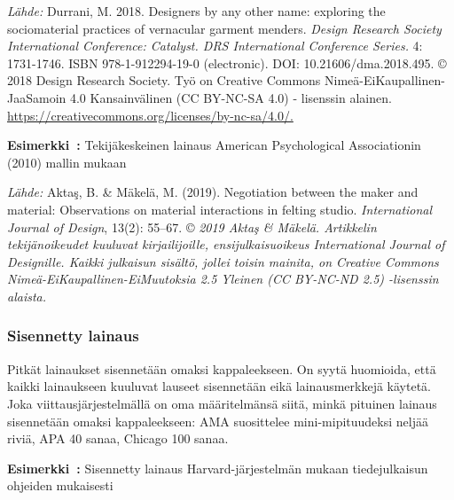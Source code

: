 \documentclass[finnish, 12pt, a4paper, arts, utf8, a-2b, online]{aaltothesis}
\begin{document}
\vspace{1ex}
\noindent
\textit{Lähde:} Durrani, M. 2018. Designers by any other name: exploring the 
sociomaterial practices of vernacular garment menders. \textit{Design Research 
	Society International Conference: Catalyst. DRS International Conference 
	Series.} 4: 1731-1746. ISBN 978-1-912294-19-0 (electronic). 
DOI: 10.21606/dma.2018.495. \copyright{} 2018 Design Research Society. Työ on  
Creative Commons Nimeä-EiKaupallinen-JaaSamoin 4.0 Kansainvälinen (CC BY-NC-SA 
4.0) - lisenssin alainen. 
\url{https://creativecommons.org/licenses/by-nc-sa/4.0/.}

\vspace{1em}
\noindent
{}
\textsf{\textbf{Esimerkki~\theexample:}} Tekijäkeskeinen lainaus American Psychological Associationin (2010) mallin mukaan

\vspace{1ex}
\noindent
{}

\vspace{1ex}
\noindent
\textit{Lähde:} Aktaş, B. \& Mäkelä, M. (2019). Negotiation between the maker 
and material: Observations on material interactions in felting studio. 
\textit{International Journal of Design}, 13(2): 55--67. \copyright{} 
\textit{2019 Aktaş \& Mäkelä. Artikkelin tekijänoikeudet kuuluvat 
	kirjailijoille, ensijulkaisuoikeus International Journal of Designille. 
	Kaikki julkaisun sisältö, jollei toisin mainita, on Creative Commons 
	Nimeä-EiKaupallinen-EiMuutoksia 2.5 Yleinen (CC BY-NC-ND 2.5) -lisenssin 
	alaista.}


\subsubsection*{Sisennetty lainaus}

Pitkät lainaukset sisennetään omaksi kappaleekseen. On syytä huomioida, että 
kaikki lainaukseen kuuluvat lauseet sisennetään eikä lainausmerkkejä käytetä. 
Joka viittausjärjestelmällä on oma määritelmänsä siitä, minkä pituinen lainaus 
sisennetään omaksi kappaleekseen: AMA suosittelee mini-mipituudeksi neljää 
riviä, APA 40 sanaa, Chicago 100 sanaa.

\vspace{1em}
\noindent
{}
\textsf{\textbf{Esimerkki~\theexample:}} Sisennetty lainaus Harvard-järjestelmän mukaan tiedejulkaisun ohjeiden mukaisesti
\end{document}
